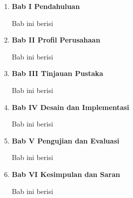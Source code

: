 \begin{enumerate}[nolistsep]

  \item \textbf{Bab I Pendahuluan}
  \vspace{0.5ex}

  Bab ini berisi \lipsum[1][1-3]
  \vspace{0.5ex}

  \item \textbf{Bab II Profil Perusahaan}
  \vspace{0.5ex}

  Bab ini berisi \lipsum[1][1-3]
  \vspace{0.5ex}

  \item \textbf{Bab III Tinjauan Pustaka}
  \vspace{0.5ex}

  Bab ini berisi \lipsum[1][1-3]
  \vspace{0.5ex}

  \item \textbf{Bab IV Desain dan Implementasi}
  \vspace{0.5ex}

  Bab ini berisi \lipsum[1][1-3]
  \vspace{0.5ex}

  \item \textbf{Bab V Pengujian dan Evaluasi}
  \vspace{0.5ex}

  Bab ini berisi \lipsum[1][1-3]
  \vspace{0.5ex}

  \item \textbf{Bab VI Kesimpulan dan Saran}
  \vspace{0.5ex}

  Bab ini berisi \lipsum[1][1-3]
  \vspace{0.5ex}

\end{enumerate}
\vspace{0.5ex}
